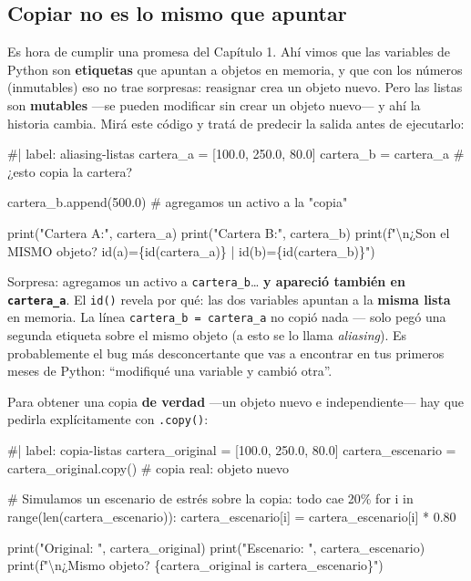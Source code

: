 \documentclass[
  spanish,
  letterpaper,
  DIV=11,
  numbers=noendperiod]{scrreprt}
\newenvironment{Shaded}{\begin{snugshade}}{\end{snugshade}}
\newcommand{\NormalTok}[1]{\textcolor[rgb]{0.00,0.23,0.31}{#1}}
\begin{document}
\subsection{Copiar no es lo mismo que
apuntar}\label{copiar-no-es-lo-mismo-que-apuntar}

Es hora de cumplir una promesa del Capítulo 1. Ahí vimos que las
variables de Python son \textbf{etiquetas} que apuntan a objetos en
memoria, y que con los números (inmutables) eso no trae sorpresas:
reasignar crea un objeto nuevo. Pero las listas son \textbf{mutables}
---se pueden modificar sin crear un objeto nuevo--- y ahí la historia
cambia. Mirá este código y tratá de predecir la salida antes de
ejecutarlo:

\begin{Shaded}
\begin{Highlighting}[]
\NormalTok{\#| label: aliasing{-}listas}
\NormalTok{cartera\_a = [100.0, 250.0, 80.0]}
\NormalTok{cartera\_b = cartera\_a          \# ¿esto copia la cartera?}

\NormalTok{cartera\_b.append(500.0)        \# agregamos un activo a la "copia"}

\NormalTok{print("Cartera A:", cartera\_a)}
\NormalTok{print("Cartera B:", cartera\_b)}
\NormalTok{print(f"\textbackslash{}n¿Son el MISMO objeto? id(a)=\{id(cartera\_a)\} | id(b)=\{id(cartera\_b)\}")}
\end{Highlighting}
\end{Shaded}

Sorpresa: agregamos un activo a \texttt{cartera\_b}\ldots{} \textbf{y
apareció también en \texttt{cartera\_a}}. El \texttt{id()} revela por
qué: las dos variables apuntan a la \textbf{misma lista} en memoria. La
línea \texttt{cartera\_b\ =\ cartera\_a} no copió nada --- solo pegó una
segunda etiqueta sobre el mismo objeto (a esto se lo llama
\emph{aliasing}). Es probablemente el bug más desconcertante que vas a
encontrar en tus primeros meses de Python: ``modifiqué una variable y
cambió otra''.

Para obtener una copia \textbf{de verdad} ---un objeto nuevo e
independiente--- hay que pedirla explícitamente con \texttt{.copy()}:

\begin{Shaded}
\begin{Highlighting}[]
\NormalTok{\#| label: copia{-}listas}
\NormalTok{cartera\_original = [100.0, 250.0, 80.0]}
\NormalTok{cartera\_escenario = cartera\_original.copy()   \# copia real: objeto nuevo}

\NormalTok{\# Simulamos un escenario de estrés sobre la copia: todo cae 20\%}
\NormalTok{for i in range(len(cartera\_escenario)):}
\NormalTok{    cartera\_escenario[i] = cartera\_escenario[i] * 0.80}

\NormalTok{print("Original:  ", cartera\_original)}
\NormalTok{print("Escenario: ", cartera\_escenario)}
\NormalTok{print(f"\textbackslash{}n¿Mismo objeto? \{cartera\_original is cartera\_escenario\}")}
\end{Highlighting}
\end{Shaded}
\end{document}

